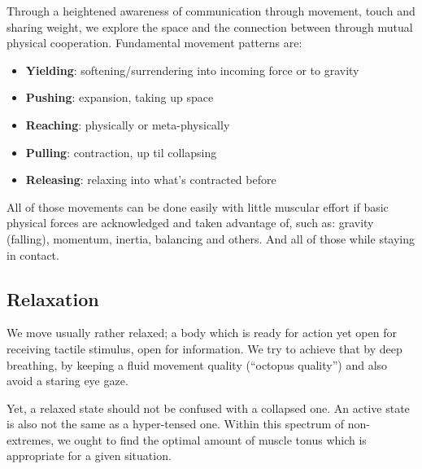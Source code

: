 Through a heightened awareness of communication through movement, touch and sharing weight, we explore the space and the connection between through mutual physical cooperation.
Fundamental movement patterns are:

\begin{itemize}
    \item \textbf{Yielding}: softening/surrendering into incoming force or to gravity
    \item \textbf{Pushing}: expansion, taking up space
    \item \textbf{Reaching}: physically or meta-physically
    \item \textbf{Pulling}: contraction, up til collapsing
    \item \textbf{Releasing}: relaxing into what's contracted before
\end{itemize}

All of those movements can be done easily with little muscular effort if basic physical forces are acknowledged and taken advantage of, such as: gravity (falling), momentum, inertia, balancing and others.
And all of those while staying in contact.

\subsection{Relaxation}\label{subsec:relaxation}

We move usually rather relaxed; a body which is ready for action yet open for receiving tactile stimulus, open for information.
We try to achieve that by deep breathing, by keeping a fluid movement quality (``octopus quality'') and also avoid a staring eye gaze.

Yet, a relaxed state should not be confused with a collapsed one.
An active state is also not the same as a hyper-tensed one.
Within this spectrum of non-extremes, we ought to find the optimal amount of muscle tonus which is appropriate for a given situation.
